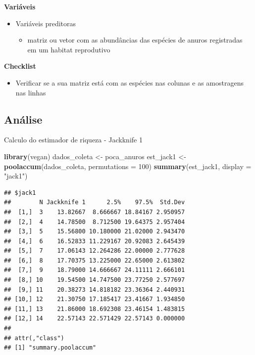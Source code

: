\documentclass[
]{book}
\newenvironment{Shaded}{\begin{snugshade}}{\end{snugshade}}
\newcommand{\DataTypeTok}[1]{\textcolor[rgb]{0.13,0.29,0.53}{#1}}
\newcommand{\DecValTok}[1]{\textcolor[rgb]{0.00,0.00,0.81}{#1}}
\newcommand{\KeywordTok}[1]{\textcolor[rgb]{0.13,0.29,0.53}{\textbf{#1}}}
\newcommand{\NormalTok}[1]{#1}
\newcommand{\StringTok}[1]{\textcolor[rgb]{0.31,0.60,0.02}{#1}}
\providecommand{\tightlist}{%
  \setlength{\itemsep}{0pt}\setlength{\parskip}{0pt}}
\begin{document}
\textbf{Variáveis}

\begin{itemize}
\tightlist
\item
  Variáveis preditoras

  \begin{itemize}
  \tightlist
  \item
    matriz ou vetor com as abundâncias das espécies de anuros registradas em um habitat reprodutivo
  \end{itemize}
\end{itemize}

\textbf{Checklist}

\begin{itemize}
\tightlist
\item
  Verificar se a sua matriz está com as espécies nas colunas e as amostragens nas linhas
\end{itemize}

\hypertarget{anuxe1lise-3}{%
\subsection{Análise}\label{anuxe1lise-3}}

Calculo do estimador de riqueza - Jackknife 1

\begin{Shaded}
\begin{Highlighting}[]
\KeywordTok{library}\NormalTok{(vegan)}
\NormalTok{dados_coleta <-}\StringTok{ }\NormalTok{poca_anuros}
\NormalTok{est_jack1 <-}\StringTok{ }\KeywordTok{poolaccum}\NormalTok{(dados_coleta, }\DataTypeTok{permutations =} \DecValTok{100}\NormalTok{)}
\KeywordTok{summary}\NormalTok{(est_jack1, }\DataTypeTok{display =} \StringTok{"jack1"}\NormalTok{)}
\end{Highlighting}
\end{Shaded}

\begin{verbatim}
## $jack1
##        N Jackknife 1      2.5%    97.5%  Std.Dev
##  [1,]  3    13.82667  8.666667 18.84167 2.950957
##  [2,]  4    14.78500  8.712500 19.64375 2.957404
##  [3,]  5    15.56800 10.180000 21.02000 2.943470
##  [4,]  6    16.52833 11.229167 20.92083 2.645439
##  [5,]  7    17.06143 12.264286 22.00000 2.777628
##  [6,]  8    17.70375 13.225000 22.65000 2.613802
##  [7,]  9    18.79000 14.666667 24.11111 2.666101
##  [8,] 10    19.54500 14.747500 23.77250 2.577697
##  [9,] 11    20.38273 14.818182 23.36364 2.440931
## [10,] 12    21.30750 17.185417 23.41667 1.934850
## [11,] 13    21.86000 18.692308 23.46154 1.483815
## [12,] 14    22.57143 22.571429 22.57143 0.000000
## 
## attr(,"class")
## [1] "summary.poolaccum"
\end{verbatim}
\end{document}

